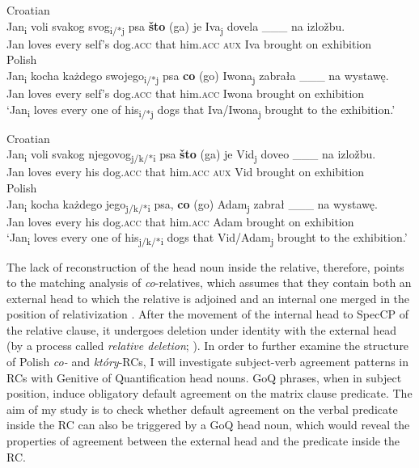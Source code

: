 \documentclass[output=paper]{langsci/langscibook}
\begin{document}
\ea%
    \label{ex:leska:15}
    \ea    Croatian\\
      \gll Jan\textsubscript{i} voli   svakog   svog\textsubscript{i/*j} psa   \textbf{što} (ga)   je   Iva\textsubscript{j} dovela \_\_\_ na izložbu. \\
           Jan   loves   every   self’s   dog.\textsc{acc}  that  him.\textsc{acc}  \textsc{aux}  Iva   brought {} on exhibition  \\
      \ex   Polish\\
      \gll  Jan\textsubscript{i} kocha   każdego   swojego\textsubscript{i/*j} psa   \textbf{co}   (go)   Iwona\textsubscript{j}    zabrała \_\_\_   na wystawę.       \\
            Jan   loves   every   self’s   dog.\textsc{acc}   that  him.\textsc{acc}  Iwona    brought {}  on exhibition         \\
      \glt  ‘Jan\textsubscript{i} loves every one of his\textsubscript{i/*j} dogs that Iva\slash Iwona\textsubscript{j} brought to the exhibition.’   
    \z
\z



\ea%
    \label{ex:leska:16}
    \ea  Croatian\\
    \gll Jan\textsubscript{i}  voli   svakog   njegovog\textsubscript{j/k/*i} psa   \textbf{što} (ga)   je   Vid\textsubscript{j}  doveo \_\_\_   na izložbu.   \\
         Jan   loves every   his   dog.\textsc{acc}  that him.\textsc{acc} \textsc{aux}  Vid                               brought {}  on exhibition \\
    \ex  Polish\\
    \gll Jan\textsubscript{i} kocha   każdego   jego\textsubscript{j/k/*i} psa,   \textbf{co}  (go)     Adam\textsubscript{j}   zabrał \_\_\_     na wystawę.\\
         Jan  loves   every   his   dog.\textsc{acc}  that  him.\textsc{acc}  Adam     brought {}  on exhibition    \\
    \glt ‘Jan\textsubscript{i} loves every one of his\textsubscript{j/k/*i} dogs that Vid\slash Adam\textsubscript{j} brought to the exhibition.’
    \z
\z

The lack of reconstruction of the head noun inside the relative, therefore, points to the matching analysis of \textit{co}{}-relatives, which assumes that they contain both an external head to which the relative is adjoined and an internal one merged in the position of relativization \citep{Bhatt2002,Sauerland2002,Hulsey2006}. After the movement of the internal head to SpecCP of the relative clause, it undergoes deletion under identity with the external head (by a process called \textit{relative deletion}; \citealt{Sauerland2002}). In order to further examine the structure of Polish \textit{co{}-} and \textit{który}{}-RCs, I will investigate subject-verb agreement patterns in RCs with Genitive of Quantification head nouns. GoQ phrases, when in subject position, induce obligatory default agreement on the matrix clause predicate. The aim of my study is to check whether default agreement on the verbal predicate inside the RC can also be triggered by a GoQ head noun, which would reveal the properties of agreement between the external head and the predicate inside the RC.
\end{document}
